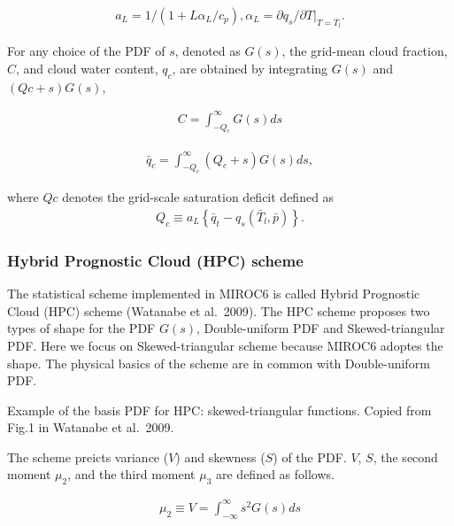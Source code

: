 \begin{eqnarray}
a_{L}=1 /\left(1+L \alpha_{L} / c_{p}\right), \alpha_{L}=\partial q_{s} /\left.\partial T\right|_{T=\bar{T_l}}.
\end{eqnarray}

For any choice of the PDF of \(s\), denoted as \(G(s)\), the grid-mean
cloud fraction, \(C\), and cloud water content, \(q_c\), are obtained by
integrating \(G(s)\) and \((Qc + s)G(s)\),

\begin{eqnarray}
C=\int_{-Q_{c}}^{\infty}G(s)ds
\end{eqnarray}

\begin{eqnarray}
\bar{q}_{c}=\int_{-Q_{c}}^{\infty}\left(Q_{c}+s\right)G(s)ds,
\end{eqnarray}

where \(Qc\) denotes the grid-scale saturation deficit defined as \begin{eqnarray}
Q_{c} \equiv a_{L}\left\{\bar{q}_{t}-q_{s}\left(\bar{T}_{l}, \bar{p}\right)\right\}.
\end{eqnarray}

\hypertarget{hybrid-prognostic-cloud-hpc-scheme}{%
\subsubsection{Hybrid Prognostic Cloud (HPC)
scheme}\label{hybrid-prognostic-cloud-hpc-scheme}}

The statistical scheme implemented in MIROC6 is called Hybrid Prognostic
Cloud (HPC) scheme (Watanabe et al.~2009). The HPC scheme proposes two
types of shape for the PDF \(G(s)\), Double-uniform PDF and
Skewed-triangular PDF. Here we focus on Skewed-triangular scheme because
MIROC6 adoptes the shape. The physical basics of the scheme are in
common with Double-uniform PDF.


Example of the basis PDF for HPC: skewed-triangular functions. Copied
from Fig.1 in Watanabe et al.~2009.

The scheme preicts variance (\(V\)) and skewness (\(S\)) of the PDF.
\(V\), \(S\), the second moment \(\mu_2\), and the third moment
\(\mu_3\) are defined as follows.

\begin{eqnarray}
\mu_{2} \equiv V=\int_{-\infty}^{\infty} s^{2} G(s) ds
\end{eqnarray}

